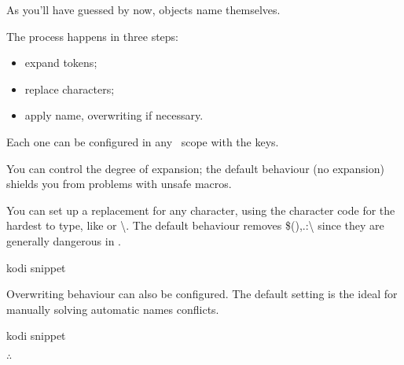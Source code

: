 As you'll have guessed by now, objects name themselves.

The process happens in three steps:
\begin{itemize}[nosep]
  \item expand tokens;
  \item replace characters;
  \item apply name, overwriting if necessary.
  \end{itemize}

Each one can be configured in any \koDi\ scope with the keys.

You can control the degree of expansion; the default behaviour (no expansion)
shields you from problems with unsafe macros.

You can set up a replacement for any character, using the character code for
the hardest to type, like {\ttfamily \textvisiblespace} or {\ttfamily \textbackslash}.
The default behaviour removes {\ttfamily \$(),.:\textbackslash} since they
are generally dangerous in \TikZ.

\begin{tcblisting}{kodi snippet}
\end{tcblisting}

Overwriting behaviour can also be configured. The default setting is the ideal
for manually solving automatic names conflicts.

\begin{tcblisting}{kodi snippet}
\end{tcblisting}

\hfill$\therefore$\hfill\null

